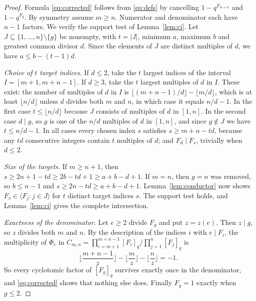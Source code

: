 \documentclass[11pt,a4paper]{article}
\theoremstyle{definition}\newtheorem{definition}[theorem]{Definition}
\theoremstyle{remark}\newtheorem{remark}[theorem]{Remark}\newtheorem{example}[theorem]{Example}
\numberwithin{equation}{section}
\begin{document}
\begin{proof}
Formula \eqref{eq:corrected} follows from \eqref{eq:defs} by cancelling $1-q^{F_{m+n}}$ and $1-q^{F_g}$. By symmetry assume $m\ge n$. Numerator and denominator each have $n-1$ factors. We verify the support test of Lemma~\ref{lem:ci}. Let $J\subseteq\{1,\ldots,n\}\setminus\{g\}$ be nonempty, with $t=|J|$, minimum $a$, maximum $b$ and greatest common divisor $d$. Since the elements of $J$ are distinct multiples of $d$, we have $a\le b-(t-1)d$.

\emph{Choice of $t$ target indices.} If $d\le2$, take the $t$ largest indices of the interval $I=[m+1,m+n-1]$. If $d\ge3$, take the $t$ largest multiples of $d$ in $I$. These exist: the number of multiples of $d$ in $I$ is $\lfloor (m+n-1)/d\rfloor-\lfloor m/d\rfloor$, which is at least $\lfloor n/d\rfloor$ unless $d$ divides both $m$ and $n$, in which case it equals $n/d-1$. In the first case $t\le\lfloor n/d\rfloor$ because $J$ consists of multiples of $d$ in $[1,n]$. In the second case $d\mid g$, so $g$ is one of the $n/d$ multiples of $d$ in $[1,n]$, and since $g\notin J$ we have $t\le n/d-1$. In all cases every chosen index $s$ satisfies $s\ge m+n-td$, because any $td$ consecutive integers contain $t$ multiples of $d$; and $F_d\mid F_s$, trivially when $d\le2$.

\emph{Size of the targets.} If $m\ge n+1$, then $s\ge 2n+1-td\ge 2b-td+1\ge a+b-d+1$. If $m=n$, then $g=n$ was removed, so $b\le n-1$ and $s\ge 2n-td\ge a+b-d+1$. Lemma~\ref{lem:conductor} now shows $F_s\in\langle F_j:j\in J\rangle$ for $t$ distinct target indices $s$. The support test holds, and Lemma~\ref{lem:ci} gives the complete intersection.

\emph{Exactness of the denominator.} Let $e\ge2$ divide $F_g$ and put $z=z(e)$. Then $z\mid g$, so $z$ divides both $m$ and $n$. By the description of the indices $i$ with $e\mid F_i$, the multiplicity of $\Phi_e$ in $C_{m,n}=\prod_{i=m+1}^{m+n-1}[F_i]_q/\prod_{j=1}^n[F_j]_q$ is
\[
 \Big\lfloor\frac{m+n-1}{z}\Big\rfloor-\Big\lfloor\frac m z\Big\rfloor-\Big\lfloor\frac n z\Big\rfloor=-1.
\]
So every cyclotomic factor of $[F_g]_q$ survives exactly once in the denominator, and \eqref{eq:corrected} shows that nothing else does. Finally $F_g=1$ exactly when $g\le2$.
\end{proof}
\end{document}
